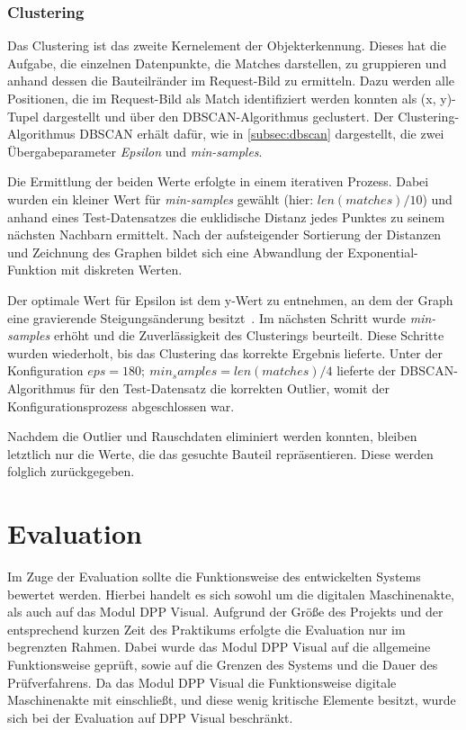 \documentclass[
    type=Prakikumsbericht,
    status=draft, %
    language=german, %
    bibengine=bibtex,
]{unibwm-inf-thesis}
\begin{document}
    \subsection{Clustering} \label{subsubsec:clustering}
    Das Clustering ist das zweite Kernelement der Objekterkennung.
    Dieses hat die Aufgabe, die einzelnen Datenpunkte, die Matches darstellen, zu gruppieren und anhand dessen die Bauteilränder im Request-Bild zu ermitteln.
    Dazu werden alle Positionen, die im Request-Bild als Match identifiziert werden konnten als (x, y)-Tupel dargestellt und über den \ac{DBSCAN}-Algorithmus geclustert.
    Der Clustering-Algorithmus \ac{DBSCAN} erhält dafür, wie in \autoref{subsec:dbscan} dargestellt, die zwei Übergabeparameter \textit{Epsilon} und \textit{min-samples}.

    Die Ermittlung der beiden Werte erfolgte in einem iterativen Prozess.
    Dabei wurden ein kleiner Wert für \textit{min-samples} gewählt (hier: $len(matches) / 10 $) und anhand eines Test-Datensatzes die euklidische Distanz jedes Punktes zu seinem nächsten Nachbarn ermittelt.
    Nach der aufsteigender Sortierung der Distanzen und Zeichnung des Graphen bildet sich eine Abwandlung der Exponential-Funktion mit diskreten Werten.

    Der optimale Wert für Epsilon ist dem y-Wert zu entnehmen, an dem der Graph eine gravierende Steigungsänderung besitzt~\citep{Maklin2019}.
    Im nächsten Schritt wurde \textit{min-samples} erhöht und die Zuverlässigkeit des Clusterings beurteilt.
    Diese Schritte wurden wiederholt, bis das Clustering das korrekte Ergebnis lieferte.
    Unter der Konfiguration $eps = 180; ~ min_samples=len(matches) / 4$ lieferte der \ac{DBSCAN}-Algorithmus für den Test-Datensatz die korrekten Outlier, womit der Konfigurationsprozess abgeschlossen war.

    Nachdem die Outlier und Rauschdaten eliminiert werden konnten, bleiben letztlich nur die Werte, die das gesuchte Bauteil repräsentieren.
    Diese werden folglich zurückgegeben.


    \chapter{Evaluation}
    Im Zuge der Evaluation sollte die Funktionsweise des entwickelten Systems bewertet werden.
    Hierbei handelt es sich sowohl um die digitalen Maschinenakte, als auch auf das Modul \ac{DPP} Visual.
    Aufgrund der Größe des Projekts und der entsprechend kurzen Zeit des Praktikums erfolgte die Evaluation nur im begrenzten Rahmen.
    Dabei wurde das Modul \ac{DPP} Visual auf die allgemeine Funktionsweise geprüft, sowie auf die Grenzen des Systems und die Dauer des Prüfverfahrens.
    Da das Modul \ac{DPP} Visual die Funktionsweise digitale Maschinenakte mit einschließt, und diese wenig kritische Elemente besitzt, wurde sich bei der Evaluation auf \ac{DPP} Visual beschränkt.
\end{document}
